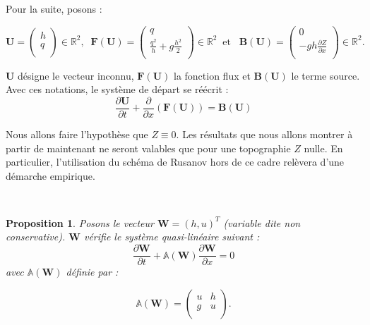 \documentclass[
11pt, %
francais, %
singlespacing, %
headsepline, %
]{MastersDoctoralThesis} %
\newtheorem{prop}{Proposition}
\begin{document}
Pour la suite, posons :

\begin{center}

$\textbf{U}=\begin{pmatrix}
   h \\
    q \\
\end{pmatrix}\in\mathbb{R}^{2},  \phantom{..} \textbf{F} (\textbf{U}) =\begin{pmatrix}
   q \\
   \frac{q^{2}}{h}+g\frac{h^{2}}{2} \\
\end{pmatrix}\in\mathbb{R}^{2} \phantom{..} \text{et} \phantom{...} \textbf{B} (\textbf{U}) =\begin{pmatrix}
   0 \\
   -gh \frac{\partial Z}{\partial x}\\
\end{pmatrix}\in\mathbb{R}^{2}.
$
\end{center}

$\textbf{U}$ désigne le vecteur inconnu, $\textbf{F} (\textbf{U})$ la fonction flux et $\textbf{B} (\textbf{U})$ le terme source. Avec ces notations,
le système de départ se réécrit : $$\frac{\partial\textbf{U}}{\partial t}+\frac{\partial}{\partial x}(\textbf{F} (\textbf{U})) = \textbf{B} (\textbf{U})$$

Nous allons faire l'hypothèse que $Z \equiv 0$. Les résultats que nous allons montrer à partir de maintenant ne seront valables que pour une topographie $Z$ nulle.
En particulier, l'utilisation du schéma de Rusanov hors de ce cadre relèvera d'une démarche empirique.

\

\begin{prop}
Posons le vecteur $\textbf{W}= (h, u)^{T}$ (variable dite non conservative). $\textbf{W}$ vérifie le système quasi-linéaire suivant :
$$ \frac{\partial \textbf{W}}{\partial t} +\mathbb{A}(\textbf{W}) \frac{\partial\textbf{W}}{\partial x} = 0 \label{ql} $$
avec $\mathbb{A}(\textbf{W})$ définie par :

$$\mathbb{A}(\textbf{W}) =\begin{pmatrix}
   u & h  \\
   g & u  \\
\end{pmatrix}.$$

\end{prop}
\end{document}
